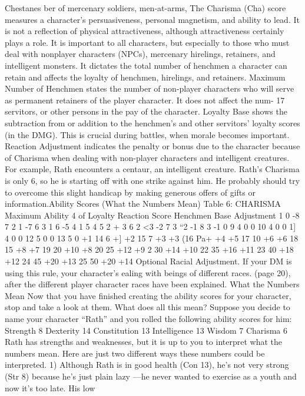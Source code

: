 \documentclass[../main.tex]{subfiles}
\begin{document}
\begin{multicols}{3}
Chestanes ber of mercenary soldiers, men-at-arms,
The Charisma (Cha)
score measures a character's persuasiveness,
personal magnetism, and ability to lead. It is
not a reflection of physical attractiveness, although attractiveness certainly plays a role.
It is important to all characters, but especially to those who must deal with nonplayer characters (NPCs), mercenary
hirelings, retainers, and intelligent monsters.
It dictates the total number of henchmen a
character can retain and affects the loyalty of
henchmen, hirelings, and retainers.
Maximum Number of Henchmen states
the number of non-player characters who
will serve as permanent retainers of the
player character. It does not affect the num-
17
servitors, or other persons in the pay of the
character.
Loyalty Base shows the subtraction from
or addition to the henchmen’s and other servitors’ loyalty scores (in the DMG). This is
crucial during battles, when morale becomes important.
Reaction Adjustment indicates the penalty or bonus due to the character because
of Charisma when dealing with non-player
characters and intelligent creatures. For example, Rath encounters a centaur, an intelligent creature. Rath’s Charisma is only 6, so
he is starting off with one strike against him.
He probably should try to overcome this
slight handicap by making generous offers
of gifts or information.Ability Scores (What the Numbers Mean)
Table 6: CHARISMA
Maximum
Ability 4 of Loyalty Reaction
Score Henchmen Base Adjustment
1 0 -8 7
2 1 -7 6
3 1 6 -5
4 1 5 4
5 2 + 3
6 2 <3 -2
7 3 “2 -1
8 3 -1 0
9 4 0 0
10 4 0 0
1] 4 0 0
12 5 0 0
13 5 0 +1
14 6 +] +2
15 7 +3 +3
(16 Pa+ +4 +5
17 10 +6 +6
18 15 +8 +7
19 20 +10 +8
20 25 +12 +9
2 30 +14 +10
22 35 +16 +11
23 40 +18 +12
24 45 +20 +13
25 50 +20 +14
Optional Racial Adjustment. If your
DM is using this rule, your character's
ealing with beings of different races.
(page 20), after the different player character races have been explained.
What the Numbers Mean
Now that you have
finished creating the ability scores for your
character, stop and take a look at them.
What does all this mean?
Suppose you decide to name your character “Rath” and you rolled the following ability scores for him:
Strength 8
Dexterity 14
Constitution 13
Intelligence 13
Wisdom 7
Charisma 6
Rath has strengths and weaknesses, but it
is up to you to interpret what the numbers
mean. Here are just two different ways these
numbers could be interpreted.
1) Although Rath is in good health (Con
13), he’s not very strong (Str 8) because he's
just plain lazy —he never wanted to exercise
as a youth and now it's too late. His low

\end{multicols}
\end{document}
